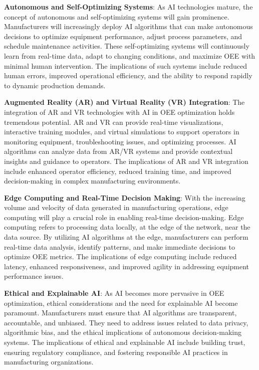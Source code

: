 \documentclass[12pt]{article}
\begin{document}
\textbf{Autonomous and Self-Optimizing Systems}:
As AI technologies mature, the concept of autonomous and self-optimizing systems will gain prominence. Manufacturers will increasingly deploy AI algorithms that can make autonomous decisions to optimize equipment performance, adjust process parameters, and schedule maintenance activities. These self-optimizing systems will continuously learn from real-time data, adapt to changing conditions, and maximize OEE with minimal human intervention. The implications of such systems include reduced human errors, improved operational efficiency, and the ability to respond rapidly to dynamic production demands.
\vspace{0.3cm}

\textbf{Augmented Reality (AR) and Virtual Reality (VR) Integration}:
The integration of AR and VR technologies with AI in OEE optimization holds tremendous potential. AR and VR can provide real-time visualizations, interactive training modules, and virtual simulations to support operators in monitoring equipment, troubleshooting issues, and optimizing processes. AI algorithms can analyze data from AR/VR systems and provide contextual insights and guidance to operators. The implications of AR and VR integration include enhanced operator efficiency, reduced training time, and improved decision-making in complex manufacturing environments.
\vspace{0.3cm}

\textbf{Edge Computing and Real-Time Decision Making}:
With the increasing volume and velocity of data generated in manufacturing operations, edge computing will play a crucial role in enabling real-time decision-making. Edge computing refers to processing data locally, at the edge of the network, near the data source. By utilizing AI algorithms at the edge, manufacturers can perform real-time data analysis, identify patterns, and make immediate decisions to optimize OEE metrics. The implications of edge computing include reduced latency, enhanced responsiveness, and improved agility in addressing equipment performance issues.
\vspace{0.3cm}

\textbf{Ethical and Explainable AI}:
As AI becomes more pervasive in OEE optimization, ethical considerations and the need for explainable AI become paramount. Manufacturers must ensure that AI algorithms are transparent, accountable, and unbiased. They need to address issues related to data privacy, algorithmic bias, and the ethical implications of autonomous decision-making systems. The implications of ethical and explainable AI include building trust, ensuring regulatory compliance, and fostering responsible AI practices in manufacturing organizations.
\vspace{0.3cm}
\end{document}
